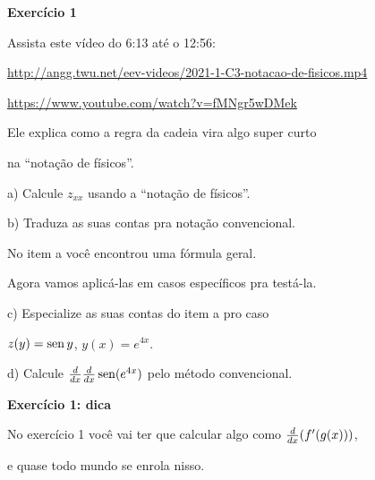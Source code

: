 \documentclass[oneside,12pt]{article}
\begin{document}
\newpage


{\bf Exercício 1}

\ssk

Assista este vídeo do 6:13 até o 12:56:

\ssk

{\footnotesize

\url{http://angg.twu.net/eev-videos/2021-1-C3-notacao-de-fisicos.mp4}

\url{https://www.youtube.com/watch?v=fMNgr5wDMek}

}

\ssk

Ele explica como a regra da cadeia vira algo super curto

na ``notação de físicos''.

\msk

a) Calcule $z_{xx}$ usando a ``notação de físicos''.

b) Traduza as suas contas pra notação convencional.

\msk

No item a você encontrou uma fórmula geral.

Agora vamos aplicá-las em casos específicos pra testá-la.

\msk

c) Especialize as suas contas do item a pro caso

\phantom{c) }$z(y) = \operatorname{sen} y$, $y(x) = e^{4x}$.

d) Calcule $\frac{d}{dx}\frac{d}{dx} \operatorname{sen}(e^{4x})$ pelo método convencional.


%



\newpage


{\bf Exercício 1: dica}

No exercício 1 você vai ter que calcular algo como $\frac{d}{dx}(f'(g(x)))$,

e quase todo mundo se enrola nisso.

\msk
\end{document}
